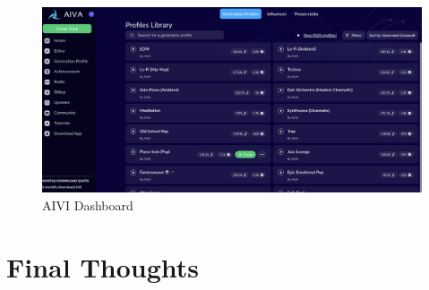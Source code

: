\documentclass[
]{book}
\begin{document}
\begin{figure}

{\centering \includegraphics[width=0.95\linewidth]{AIVI_Dashboard} 

}

\caption{AIVI Dashboard}\label{fig:unnamed-chunk-17}
\end{figure}

\hypertarget{final-thoughts}{%
\chapter{Final Thoughts}\label{final-thoughts}}
\end{document}
